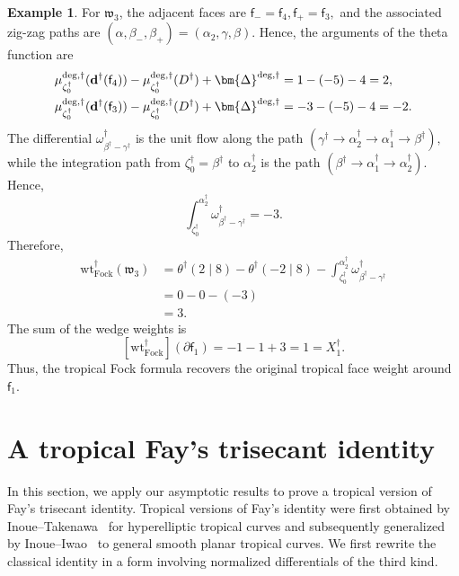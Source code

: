 \documentclass[12pt]{amsart}
\numberwithin{equation}{section}
\theoremstyle{definition}
\newtheorem{example}[theorem]{Example}
\newcommand{\wt}{\mathrm{wt}}
\def\divisor{D}
\def\trop{\dagger}
\def\bface{\mathsf{f}}
\def\dam{{\bf d}}
\def\divisor{D}
\def\vecRC{\bm{\Delta}}
\def\ptSig{\zeta}
\def\baseptT{{\ptSig_0^\trop}}
\begin{document}
\begin{example}
For $\mathfrak w_3$, the adjacent faces are
\(
\bface_-=\bface_4,
\bface_+=\bface_3,
\)
and the associated zig-zag paths are
\(
(\alpha,\beta_-,\beta_+)
=
(\alpha_2,\gamma,\beta).
\)
Hence, the arguments of the theta function are
\[
\begin{aligned}
\mu_{\baseptT}^{\mathrm{deg},\trop}
(\dam^\trop(\bface_4))
-\mu^{\mathrm{deg},\trop}_\baseptT(\divisor^\trop)
+\vecRC^{\mathrm{deg},\trop}
&=
1-(-5)-4
=
2,
\\
\mu_{\baseptT}^{\mathrm{deg},\trop}
(\dam^\trop(\bface_3))
-\mu^{\mathrm{deg},\trop}_\baseptT(\divisor^\trop)
+\vecRC^{\mathrm{deg},\trop}
&=
-3-(-5)-4
=
-2.
\end{aligned}
\]
The differential
\(
\omega_{\beta^\trop-\gamma^\trop}^\trop
\)
is the unit flow along the path
\(
(\gamma^\trop
\rightarrow
\alpha_2^\trop
\rightarrow
\alpha_1^\trop
\rightarrow
\beta^\trop),
\)
while the integration path from $\baseptT=\beta^\trop$ to
$\alpha_2^\trop$ is the path
\(
(\beta^\trop
\rightarrow
\alpha_1^\trop
\rightarrow
\alpha_2^\trop).
\)
Hence,
\[
\int_{\baseptT}^{\alpha_2^\trop}
\omega_{\beta^\trop-\gamma^\trop}^\trop
=
-3.
\]
Therefore,
\[
\begin{aligned}
\wt_{\mathrm{Fock}}^\trop(\mathfrak w_3)
&=
\theta^\trop(2\mid8)
-
\theta^\trop(-2\mid8)
-
\int_{\baseptT}^{\alpha_2^\trop}
\omega_{\beta^\trop-\gamma^\trop}^\trop
\\
&=
0-0-(-3)
\\
&=
3.
\end{aligned}
\]
The sum of the wedge weights is
\[
[\wt_{\mathrm{Fock}}^\trop](\partial\bface_1)
=
-1-1+3
=
1
=
X_1^\trop.
\]
Thus, the tropical Fock formula recovers the original tropical face
weight around $\bface_1$.
\end{example}


\section{A tropical Fay's trisecant identity}
\label{sec:tropical_fay}

In this section, we apply our asymptotic results to prove a tropical
version of Fay's trisecant identity. Tropical versions of Fay's identity
were first obtained by Inoue--Takenawa~\cite{InoueTakenawaFay} for hyperelliptic tropical curves and
subsequently generalized by Inoue--Iwao~\cite{InoueIwao2011} to general smooth
planar tropical curves. We first rewrite the classical identity in a
form involving normalized differentials of the third kind.
\end{document}

